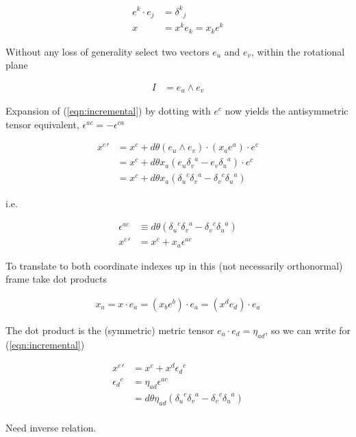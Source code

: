 \begin{align*}
e^k \cdot e_j &= {\delta^k}_j \\
x &= x^k e_k = x_k e^k
\end{align*}

Without any loss of generality select two vectors $e_u$ and $e_v$, within the rotational plane

\begin{align*}
I &= e_u \wedge e_v
\end{align*}

Expansion of (\ref{eqn:incremental}) by dotting with $e^c$ now yields the 
antisymmetric tensor equivalent, $\epsilon^{a c} = -\epsilon^{c a}$

\begin{align*}
{x^c}' 
&= x^c + {d\theta} (e_u \wedge e_v) \cdot (x_a e^a) \cdot e^c \\
&= x^c + {d\theta} x_a ( e_u {\delta_v}^a -e_v {\delta_u}^a ) \cdot e^c \\
&= x^c + {d\theta} x_a ( {\delta_u}^c {\delta_v}^a - {\delta_v}^c {\delta_u}^a ) 
\end{align*}

i.e.

\begin{align*}
\epsilon^{a c} &\equiv d\theta ({\delta_u}^c {\delta_v}^a - {\delta_v}^c {\delta_u}^a )  \\
{x^c}' &= x^c + x_a \epsilon^{a c}
\end{align*}

To translate to both coordinate indexes up in this (not necessarily orthonormal) frame take 
dot products

\begin{align*}
x_a = x \cdot e_a = (x_b e^b) \cdot e_a = (x^d e_d) \cdot e_a
\end{align*}

The dot product is the (symmetric) metric tensor $e_a \cdot e_d = \eta_{a d}$, so we can 
write for (\ref{eqn:incremental})

\begin{align*}
{x^c}' &= x^c + x^d {\epsilon_{d}}^c \\
{\epsilon_d}^c 
&= \eta_{a d} \epsilon^{a c} \\
&= d\theta \eta_{a d} ({\delta_u}^c {\delta_v}^a - {\delta_v}^c {\delta_u}^a )  \\
\end{align*}

Need inverse relation.

\EndArticle
